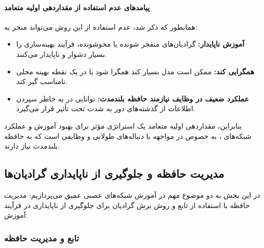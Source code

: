 \documentclass{article}
\begin{document}
\paragraph{پیامدهای عدم استفاده از مقداردهی اولیه متعامد}
همانطور که ذکر شد، عدم استفاده از این روش می‌تواند منجر به:
\begin{itemize}
	\item \textbf{آموزش ناپایدار:} گرادیان‌های منفجر شونده یا محوشونده، فرآیند بهینه‌سازی را بسیار دشوار و ناپایدار می‌کنند.
	\item \textbf{همگرایی کند:} ممکن است مدل بسیار کند همگرا شود یا در یک نقطه بهینه محلی نامناسب گیر کند.
	\item \textbf{عملکرد ضعیف در وظایف نیازمند حافظه بلندمدت:} توانایی  در به خاطر سپردن اطلاعات از گذشته‌های دور به شدت تحت تأثیر قرار می‌گیرد.
\end{itemize}
بنابراین، مقداردهی اولیه متعامد یک استراتژی مؤثر برای بهبود آموزش و عملکرد شبکه‌های ، به خصوص در مواجهه با دنباله‌های طولانی و وظایفی است که به حافظه بلندمدت نیاز دارند.


\subsection{مدیریت حافظه و جلوگیری از ناپایداری گرادیان‌ها}

در این بخش به دو موضوع مهم در آموزش شبکه‌های عصبی عمیق می‌پردازیم: مدیریت حافظه با استفاده از تابع  و روش برش گرادیان برای جلوگیری از ناپایداری در فرآیند آموزش.

\subsubsection{تابع  و مدیریت حافظه}
\end{document}
